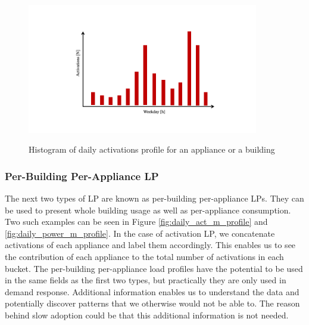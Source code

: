 \begin{figure}[H]
	\centering
	\caption{Histogram of daily activations profile for an appliance or a building}
	\includegraphics[width=0.9\textwidth]{Figures/profile_sketches/Slide5.png}
	\label{fig:daily_act_profile}
\end{figure}

\subsubsection{Per-Building Per-Appliance LP}
The next two types of LP are known as per-building per-appliance LPs.
They can be used to present whole building usage as well as per-appliance consumption. 
Two such examples can be seen in Figure \ref{fig:daily_act_m_profile} and \ref{fig:daily_power_m_profile}.
In the case of activation LP, we concatenate activations of each appliance and label them accordingly.
This enables us to see the contribution of each appliance to the total number of activations in each bucket.
The per-building per-appliance load profiles have the potential to be used in the same fields as the first two types, but practically they are only used in demand response.
Additional information enables us to understand the data and potentially discover patterns that we otherwise would not be able to.
The reason behind slow adoption could be that this additional information is not needed.

